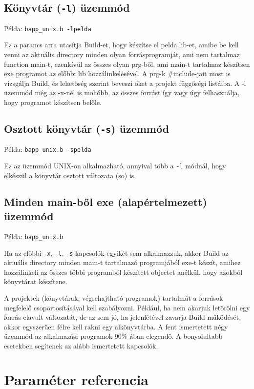 \subsection{Könyvtár ({\tt -l}) üzemmód\label{switchl}}

Példa: {\tt bapp\_unix.b -lpelda}

Ez a parancs arra utasítja Build-et, hogy készítse el pelda.lib-et,
amibe be kell venni az aktuális directory minden olyan forrásprogramját,
ami nem tartalmaz function main-t, ezenkívül az összes olyan prg-ből,
ami main-t tartalmaz készítsen exe programot az előbbi lib hozzálinkelésével.
A prg-k \#include-jait most is vizsgálja Build, és lehetőség szerint
beveszi őket a projekt függőségi listáiba.
A {-l} üzemmód még az {-x}-nél is mohóbb, az összes forrást így vagy úgy
felhasználja, hogy programot készítsen belőle. 

\subsection{Osztott könyvtár ({\tt -s}) üzemmód\label{switchs}}

Példa: {\tt bapp\_unix.b -spelda}

Ez az üzemmód UNIX-on alkalmazható, annyival több a \verb!-l!
módnál, hogy elkészül a könyvtár osztott változata (so) is.

\subsection{Minden main-ből exe (alapértelmezett) üzemmód }

Példa: {\tt bapp\_unix.b}

Ha az előbbi {\tt -x}, {\tt -l}, {\tt -s} kapcsolók egyikét sem 
alkalmazzuk, akkor Build az aktuális directory minden main-t tartalmazó
programjából exe-t készít, amihez hozzálinkeli az összes
többi programból készített objectet anélkül, hogy azokból
könyvtárat készítene.

A projektek (könyvtárak, végrehajtható programok) tartalmát a 
források megfelelő csoportosításával kell szabályozni. 
Például, ha nem akarjuk letörölni egy forrás elavult változatát, 
de az sem jó, ha jelenlétével zavarja Build működését, 
akkor egyszerűen félre kell rakni egy alkönyvtárba.
A fent ismertetett négy üzemmód az alkalmazási programok 90\%-ában 
elegendő. A bonyolultabb esetekben segítenek az alább ismertetett
kapcsolók.


\section{Paraméter referencia}

